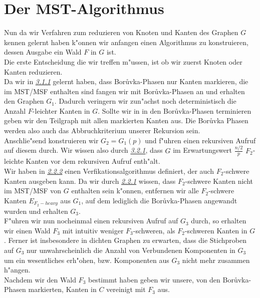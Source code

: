 \section{Der MST-Algorithmus}

Nun da wir Verfahren zum reduzieren von Knoten und Kanten des Graphen $G$ kennen
    gelernt haben  k"onnen wir anfangen einen Algorithmus zu konstruieren,
    dessen Ausgabe ein Wald $F$ in $G$ ist.\\
Die erste Entscheidung die wir treffen m"ussen, ist ob wir zuerst Knoten oder Kanten
    reduzieren. \\
Da wir in \hyperref[sec:borIdea]{\textit{3.1.1}} gelernt haben, dass
    Bor\r uvka-Phasen nur Kanten markieren, die im MST/MSF 
    enthalten sind fangen wir mit Bor\r uvka-Phasen an und erhalten den Graphen 
    $G_1$.
    Dadurch veringern wir
    zun"achst noch deterministisch die Anzahl $F$-leichter Kanten in $G$.
    Sollte wir in in den Bor\r uvka-Phasen terminieren geben wir den Teilgraph
    mit allen markierten Kanten aus.
    Die Bor\r uvka Phasen werden also auch das Abbruchkriterium unserer
    Rekursion sein.\\
Anschlie"send konstruieren wir $G_2 = G_1(p)$ und f"uhren einen rekursiven
    Aufruf auf diesem durch. 
    Wir wissen also durch \hyperref[sec:goodnessRand]{\textit{3.2.1}}, 
    dass $G$ im Erwartungswert
    $\frac{n/2}{p}$ $F_2$-leichte Kanten vor dem rekursiven Aufruf enth"alt.\\
Wir haben in \hyperref[sec:verification]{\textit{2.2.2}} einen 
    Verfikationsalgorithmus definiert, der auch $F_2$-schwere Kanten ausgeben
    kann.
    Da wir durch \hyperref[sec:fProof]{\textit{2.2.1}} wissen, dass $F_2$-schwere Kanten nicht im MST/MSF von $G$
    enthalten sein k"onnen, entfernen wir alle $F_2$-schwere Kanten $E_{F_2-heavy}$
    aus $G_1$,
    auf dem lediglich die Bor\r uvka-Phasen angewandt wurden und erhalten $G_3$.\\
F"uhren wir nun nocheinmal einen rekursiven Aufruf auf $G_3$ durch, 
    so erhalten wir 
    einen Wald $F_3$ mit intuitiv weniger $F_3$-schweren, als $F_2$-schweren Kanten in $G$.
    Ferner ist insbesondere in dichten Graphen zu erwarten, dass die Stichproben 
    auf $G_3$ nur unwahrscheinlich die Anzahl von Verbundenen Komponenten in 
    $G_3$ um ein wesentliches erh"ohen, bzw. Komponenten aus $G_3$ nicht mehr
    zusammen h"angen.\\
Nachdem wir den Wald $F_3$ bestimmt haben geben wir unsere, von den Bor\r uvka-Phasen
    markierten, Kanten in $C$ vereinigt mit $F_3$ aus.\\

